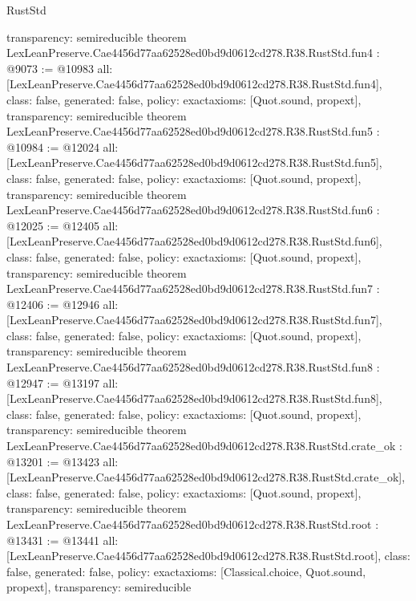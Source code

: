 \begin{lexlean}{RustStd}
\begin{coremodule}
{  transparency: semireducible
}
theorem LexLeanPreserve.Cae4456d77aa62528ed0bd9d0612cd278.R38.RustStd.fun4 : @9073 := @10983 {
  all: [LexLeanPreserve.Cae4456d77aa62528ed0bd9d0612cd278.R38.RustStd.fun4],
  class: false,
  generated: false,
  policy: exact{axioms: [Quot.sound, propext]},
  transparency: semireducible
}
theorem LexLeanPreserve.Cae4456d77aa62528ed0bd9d0612cd278.R38.RustStd.fun5 : @10984 := @12024 {
  all: [LexLeanPreserve.Cae4456d77aa62528ed0bd9d0612cd278.R38.RustStd.fun5],
  class: false,
  generated: false,
  policy: exact{axioms: [Quot.sound, propext]},
  transparency: semireducible
}
theorem LexLeanPreserve.Cae4456d77aa62528ed0bd9d0612cd278.R38.RustStd.fun6 : @12025 := @12405 {
  all: [LexLeanPreserve.Cae4456d77aa62528ed0bd9d0612cd278.R38.RustStd.fun6],
  class: false,
  generated: false,
  policy: exact{axioms: [Quot.sound, propext]},
  transparency: semireducible
}
theorem LexLeanPreserve.Cae4456d77aa62528ed0bd9d0612cd278.R38.RustStd.fun7 : @12406 := @12946 {
  all: [LexLeanPreserve.Cae4456d77aa62528ed0bd9d0612cd278.R38.RustStd.fun7],
  class: false,
  generated: false,
  policy: exact{axioms: [Quot.sound, propext]},
  transparency: semireducible
}
theorem LexLeanPreserve.Cae4456d77aa62528ed0bd9d0612cd278.R38.RustStd.fun8 : @12947 := @13197 {
  all: [LexLeanPreserve.Cae4456d77aa62528ed0bd9d0612cd278.R38.RustStd.fun8],
  class: false,
  generated: false,
  policy: exact{axioms: [Quot.sound, propext]},
  transparency: semireducible
}
theorem LexLeanPreserve.Cae4456d77aa62528ed0bd9d0612cd278.R38.RustStd.crate_ok : @13201 := @13423 {
  all: [LexLeanPreserve.Cae4456d77aa62528ed0bd9d0612cd278.R38.RustStd.crate_ok],
  class: false,
  generated: false,
  policy: exact{axioms: [Quot.sound, propext]},
  transparency: semireducible
}
theorem LexLeanPreserve.Cae4456d77aa62528ed0bd9d0612cd278.R38.RustStd.root : @13431 := @13441 {
  all: [LexLeanPreserve.Cae4456d77aa62528ed0bd9d0612cd278.R38.RustStd.root],
  class: false,
  generated: false,
  policy: exact{axioms: [Classical.choice, Quot.sound, propext]},
  transparency: semireducible
}


\end{coremodule}
\end{lexlean}
